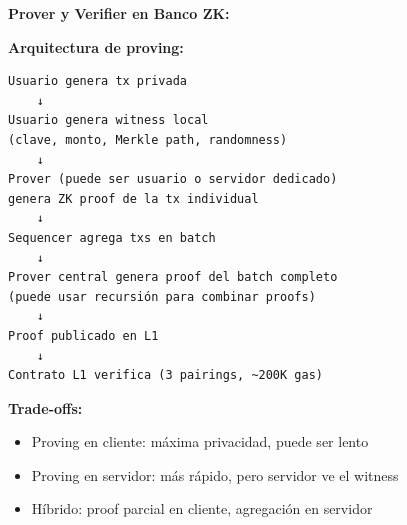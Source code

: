 \documentclass[11pt,a4paper,twoside,openright]{book}
\theoremstyle{definition}
\theoremstyle{plain}
\theoremstyle{remark}
\begin{document}
\begin{center}
\end{center}

\begin{bancozk}
\textbf{Prover y Verifier en Banco ZK:}

\textbf{Arquitectura de proving:}
\begin{verbatim}
Usuario genera tx privada
    ↓
Usuario genera witness local
(clave, monto, Merkle path, randomness)
    ↓
Prover (puede ser usuario o servidor dedicado)
genera ZK proof de la tx individual
    ↓
Sequencer agrega txs en batch
    ↓
Prover central genera proof del batch completo
(puede usar recursión para combinar proofs)
    ↓
Proof publicado en L1
    ↓
Contrato L1 verifica (3 pairings, ~200K gas)
\end{verbatim}

\textbf{Trade-offs:}
\begin{itemize}
    \item Proving en cliente: máxima privacidad, puede ser lento
    \item Proving en servidor: más rápido, pero servidor ve el witness
    \item Híbrido: proof parcial en cliente, agregación en servidor
\end{itemize}
\end{bancozk}
\end{document}
